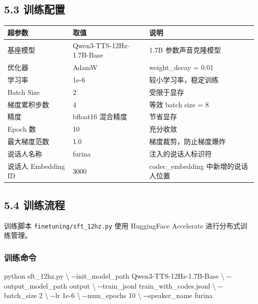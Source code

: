 \documentclass[
  english,
  letterpaper,
  DIV=11,
  numbers=noendperiod]{scrartcl}
\newenvironment{Shaded}{\begin{snugshade}}{\end{snugshade}}
\newcommand{\AttributeTok}[1]{\textcolor[rgb]{0.40,0.45,0.13}{#1}}
\newcommand{\DataTypeTok}[1]{\textcolor[rgb]{0.68,0.00,0.00}{#1}}
\newcommand{\ExtensionTok}[1]{\textcolor[rgb]{0.00,0.23,0.31}{#1}}
\newcommand{\NormalTok}[1]{\textcolor[rgb]{0.00,0.23,0.31}{#1}}
\newcounter{none} %
\begin{document}
\subsection{5.3 训练配置}\label{ux8badux7ec3ux914dux7f6e}

{\def\LTcaptype{none} %
\begin{longtable}[]{@{}lll@{}}
\toprule\noalign{}
超参数 & 取值 & 说明 \\
\midrule\noalign{}
\endhead
\bottomrule\noalign{}
\endlastfoot
基座模型 & Qwen3-TTS-12Hz-1.7B-Base & 1.7B 参数声音克隆模型 \\
优化器 & AdamW & weight\_decay = 0.01 \\
学习率 & 1e-6 & 较小学习率，稳定训练 \\
Batch Size & 2 & 受限于显存 \\
梯度累积步数 & 4 & 等效 batch size = 8 \\
精度 & bfloat16 混合精度 & 节省显存 \\
Epoch 数 & 10 & 充分收敛 \\
最大梯度范数 & 1.0 & 梯度裁剪，防止梯度爆炸 \\
说话人名称 & furina & 注入的说话人标识符 \\
说话人 Embedding ID & 3000 & codec\_embedding 中新增的说话人位置 \\
\end{longtable}
}

\subsection{5.4 训练流程}\label{ux8badux7ec3ux6d41ux7a0b}

训练脚本 \texttt{finetuning/sft\_12hz.py} 使用 HuggingFace Accelerate
进行分布式训练管理。

\subsubsection{训练命令}\label{ux8badux7ec3ux547dux4ee4}

\begin{Shaded}
\begin{Highlighting}[]
\ExtensionTok{python}\NormalTok{ sft\_12hz.py }\DataTypeTok{\textbackslash{}}
  \AttributeTok{{-}{-}init\_model\_path}\NormalTok{ Qwen3{-}TTS{-}12Hz{-}1.7B{-}Base }\DataTypeTok{\textbackslash{}}
  \AttributeTok{{-}{-}output\_model\_path}\NormalTok{ output }\DataTypeTok{\textbackslash{}}
  \AttributeTok{{-}{-}train\_jsonl}\NormalTok{ train\_with\_codes.jsonl }\DataTypeTok{\textbackslash{}}
  \AttributeTok{{-}{-}batch\_size}\NormalTok{ 2 }\DataTypeTok{\textbackslash{}}
  \AttributeTok{{-}{-}lr}\NormalTok{ 1e{-}6 }\DataTypeTok{\textbackslash{}}
  \AttributeTok{{-}{-}num\_epochs}\NormalTok{ 10 }\DataTypeTok{\textbackslash{}}
  \AttributeTok{{-}{-}speaker\_name}\NormalTok{ furina}
\end{Highlighting}
\end{Shaded}
\end{document}
